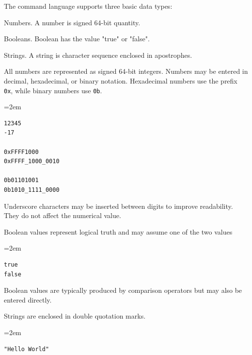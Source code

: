 
The command language supports three basic data types:

\begin{smallGapItemize}
\item Numbers. A number is signed 64-bit quantity.
\item Booleans. Boolean has the value "true" or "false".
\item Strings. A string is character sequence enclosed in apostrophes.
\end{smallGapItemize}


All numbers are represented as signed 64-bit integers. Numbers may be entered in decimal, hexadecimal, or binary notation. Hexadecimal numbers use the prefix \verb|0x|, while binary numbers use \verb|0b|.

\begin{list}{}{\leftmargin=2em}
\item
\begin{verbatim}
12345
-17

0xFFFF1000
0xFFFF_1000_0010

0b01101001
0b1010_1111_0000
\end{verbatim}
\end{list}

Underscore characters may be inserted between digits to improve readability. They do not affect the numerical value.


Boolean values represent logical truth and may assume one of the two values

\begin{list}{}{\leftmargin=2em}
\item
\begin{verbatim}
true
false
\end{verbatim}
\end{list}

Boolean values are typically produced by comparison operators but may also be entered directly.


Strings are enclosed in double quotation marks.

\begin{list}{}{\leftmargin=2em}
\item
\begin{verbatim}
"Hello World"
\end{verbatim}
\end{list}

